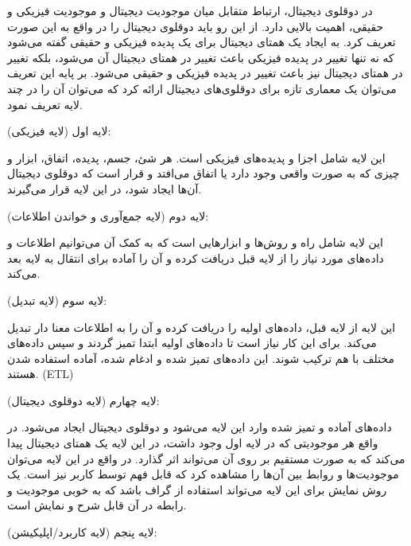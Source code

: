در دوقلوی دیجیتال، ارتباط متقابل میان موجودیت دیجیتال و موجودیت فیزیکی و حقیقی، اهمیت بالایی دارد. از این رو باید دوقلوی دیجیتال را در واقع به این صورت تعریف کرد. به ایجاد یک همتای دیجیتال برای یک پدیده فیزیکی و حقیقی گفته می‌شود که نه‌ تنها تغییر در پدیده فیزیکی باعث تغییر در همتای دیجیتال آن می‌شود، بلکه تغییر در همتای دیجیتال نیز باعث تغییر در پدیده فیزیکی و حقیقی می‌شود. بر پایه این تعریف می‌توان یک معماری تازه برای دوقلوی‌های دیجیتال ارائه کرد که می‌توان آن را در چند لایه تعریف نمود.


لایه اول (لایه فیزیکی):

این لایه شامل اجزا و پدیده‌های فیزیکی است. هر شئ، جسم، پدیده، اتفاق، ابزار و چیزی که به صورت واقعی وجود دارد یا اتفاق می‌افتد و قرار است که دوقلوی دیجیتال آن‌ها ایجاد شود، در این لایه قرار می‌گیرند.


لایه دوم (لایه جمع‌آوری و خواندن اطلاعات):

این لایه شامل راه‌‌ و روش‌ها و ابزار‌هایی است که به کمک آن می‌توانیم اطلاعات و داده‌های مورد نیاز را از لایه قبل دریافت کرده و آن را آماده برای انتقال به لایه بعد می‌کند.

لایه سوم (لایه تبدیل):

این لایه از لایه قبل، داده‌های اولیه را دریافت کرده و آن را به اطلاعات معنا دار تبدیل می‌کند. برای این کار نیاز است تا داده‌های اولیه ابتدا تمیز گردند و سپس داده‌های مختلف با هم ترکیب شوند. این داده‌های تمیز شده و ادغام شده، آماده استفاده شدن هستند. (ETL)


لایه چهارم (لایه دوقلوی دیجیتال):

داده‌های آماده و تمیز شده وارد این لایه می‌شود و دوقلوی دیجیتال ایجاد می‌شود. در واقع هر موجودیتی که در لایه اول وجود داشت، در این لایه یک همتای دیجیتال پیدا می‌کند که به صورت مستقیم بر روی آن می‌تواند اثر گذارد. در واقع در این لایه می‌توان موجودیت‌ها و روابط بین آن‌ها را مشاهده کرد که قابل فهم توسط کاربر نیز است. یک روش نمایش برای این لایه می‌تواند استفاده از گراف باشد که به خوبی موجودیت و رابطه در آن قابل شرح و نمایش است.

لایه پنجم (لایه کاربرد/اپلیکیشن):

